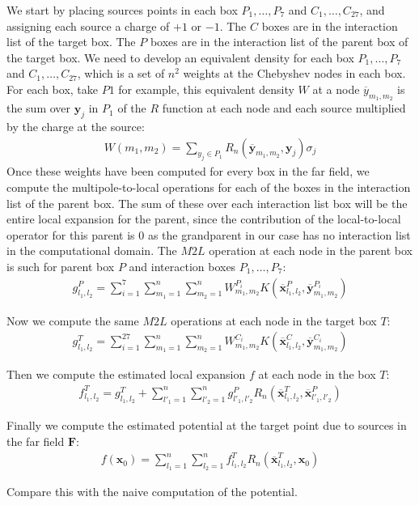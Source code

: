 \documentclass[11pt, oneside]{article}   	%
\begin{document}
\begin{appendices}
We start by placing sources points in each box $P_1,\dots,P_7$ and $C_1,\dots,C_{27}$, and assigning each source a charge of $+1$ or $-1$. The $C$ boxes are in the interaction list of the target box. The $P$ boxes are in the interaction list of the parent box of the target box. We need to develop an equivalent density for each box $P_1,\dots,P_7$ and $C_1,\dots,C_{27}$, which is a set of $n^2$ weights at the Chebyshev nodes in each box. For each box, take $P1$ for example, this equivalent density $W$ at a node $\overline{y}_{m_1,m_2}$ is the sum over $\mathbf{y}_j$ in $P_1$ of the $R$ function at each node and each source multiplied by the charge at the source:
\begin{align}
W(m_1,m_2) = \sum_{y_j\in P_1} R_n(\mathbf{\overline{y}}_{m_1,m_2},\mathbf{y}_j)\sigma_j
\end{align}
Once these weights have been computed for every box in the far field, we compute the multipole-to-local operations for each of the boxes in the interaction list of the parent box. The sum of these over each interaction list box will be the entire local expansion for the parent, since the contribution of the local-to-local operator for this parent is $0$ as the grandparent in our case has no interaction list in the computational domain. The $M2L$ operation at each node in the parent box is such for parent box $P$ and interaction boxes $P_1,\dots,P_7$:
\begin{align}
g^P_{l_1,l_2} = \sum_{i=1}^7\sum_{m_1=1}^n\sum_{m_2=1}^n W_{m_1,m_2}^{P_i}K(\mathbf{\overline{x}}^P_{l_1,l_2},\mathbf{\overline{y}}^{P_i}_{m_1,m_2})
\end{align}

Now we compute the same $M2L$ operations at each node in the target box $T$:
\begin{align}
g^T_{l_1,l_2} = \sum_{i=1}^{27}\sum_{m_1=1}^n\sum_{m_2=1}^n W_{m_1,m_2}^{C_i}K(\mathbf{\overline{x}}^C_{l_1,l_2},\mathbf{\overline{y}}^{C_i}_{m_1,m_2})
\end{align}

Then we compute the estimated local expansion $f$ at each node in the box $T$:
\begin{align}
f^T_{l_1,l_2} = g^T_{l_1,l_2} + \sum_{l'_1=1}^n\sum_{l'_2=1}^n g^P_{l'_1,l'_2}R_n(\mathbf{\overline{x}}^T_{l_1,l_2},\mathbf{\overline{x}}^P_{l'_1,l'_2})
\end{align}

Finally we compute the estimated potential at the target point due to sources in the far field $\mathbf{F}$:
\begin{align}
f(\mathbf{x}_0) = \sum_{l_1=1}^n\sum_{l_2=1}^n f^T_{l_1,l_2} R_n(\mathbf{\overline{x}}^T_{l_1,l_2},\mathbf{x}_0)
\end{align}

Compare this with the naive computation of the potential.

\end{appendices}
\end{document}

